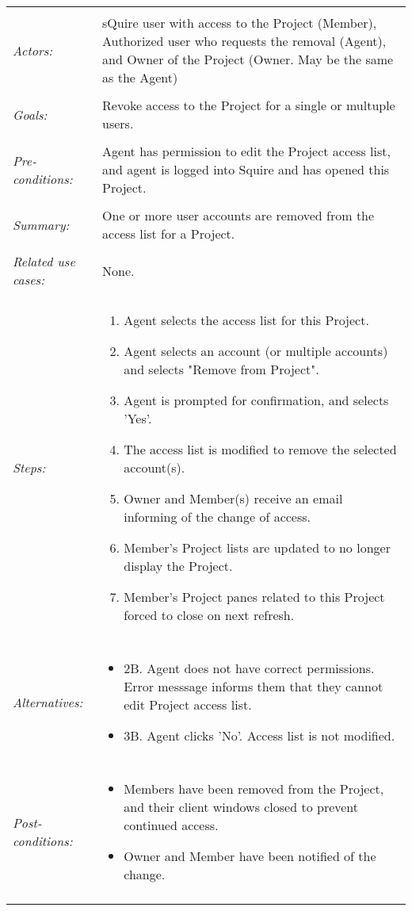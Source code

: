 \begin{tabular}{ p{2cm} p{12cm} }   
 \hline
 \\
 \textit{Actors:} & sQuire user with access to the Project (Member), Authorized user who requests the removal (Agent), and Owner of the Project (Owner. May be the same as the Agent) \\
 \\
 \textit{Goals:} & Revoke access to the Project for a single or multuple users. \\
 \\
 \textit{Pre-conditions:} & Agent has permission to edit the Project access list, and agent is logged into Squire and has opened this Project. \\
 \\
 \textit{Summary:} & One or more user accounts are removed from the access list for a Project. \\ 
 \\
 \textit{Related use cases:} & None.  \\ 
 \\
 \textit{Steps:} & \begin{enumerate}
  \item Agent selects the access list for this Project.
	 \item Agent selects an account (or multiple accounts) and selects "Remove from Project".
	 \item Agent is prompted for confirmation, and selects 'Yes'.
	 \item The access list is modified to remove the selected account(s).
	 \item Owner and Member(s) receive an email informing of the change of access.
	 \item Member's Project lists are updated to no longer display the Project.
	 \item Member's Project panes related to this Project forced to close on next refresh.
 \end{enumerate} \\
 \\
 \textit{Alternatives:} & \begin{itemize} 
	 \item 2B. Agent does not have correct permissions. Error messsage informs them that they cannot edit Project access list.
	 \item 3B. Agent clicks 'No'. Access list is not modified.
	\end{itemize}\\
 \\
 \textit{Post-conditions:} & \begin{itemize}
	 \item Members have been removed from the Project, and their client windows closed to prevent continued access.
	 \item Owner and Member have been notified of the change.
 \end{itemize}\\
 \\
\hline
\end{tabular}


